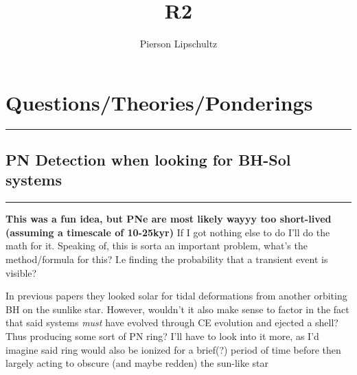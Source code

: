 \documentclass{article}
\title{R2}
\author{Pierson Lipschultz}
\theoremstyle{mytheoremstyle}
\theoremstyle{mytheoremstyle}
\theoremstyle{myproblemstyle}
\theoremstyle{myproblemstyle}
\begin{document}
    \pagestyle{fancy}

    \fancyhf{}
    \fancyfoot[L]{\nouppercase{\leftmark}} %
    \fancyfoot[R]{\thepage}%

    \renewcommand{\headrulewidth}{0pt}
    \renewcommand{\footrulewidth}{0.4pt}
    \renewcommand{\sectionmark}[1]{\markboth{#1}{}}

    \maketitle



    \section{Questions/Theories/Ponderings}
    \hrule
    \vspace{.5cm}
    
    \subsection{PN Detection when looking for BH-Sol systems}
    \hrule
    \vspace{.5cm}

    \textbf{This was a fun idea, but PNe are most likely wayyy too short-lived (assuming a timescale of 10-25kyr)} If I got nothing else to do I'll do the math for it. Speaking of, this is sorta an important problem, what's the method/formula for this? I.e finding the probability that a transient event is visible?

    In previous papers they looked solar for tidal deformations from another orbiting BH on the sunlike star. However, wouldn't it also make sense to factor in the fact that said systems \textit{must} have evolved through CE evolution and ejected a shell? Thus producing some sort of PN ring? I'll have to look into it more, as I'd imagine said ring would also be ionized for a brief(?) period of time before then largely acting to obscure (and maybe redden) the sun-like star 
    
\end{document}
